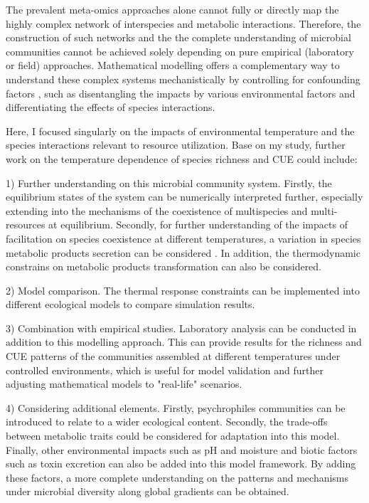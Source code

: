 \documentclass[11pt, a4paper]{article}
\begin{document}
\begin{spacing}{1.5}
The prevalent meta-omics approaches alone cannot fully or directly map the highly complex network of interspecies and metabolic interactions. Therefore, the construction of such networks and the the complete understanding of microbial communities cannot be achieved solely depending on pure empirical (laboratory or field) approaches. Mathematical modelling offers a complementary way to understand these complex systems mechanistically by controlling for confounding factors \citep{hanemaaijer2015systems, marsland2020minimal}, such as disentangling the impacts by various environmental factors and differentiating the effects of species interactions. 

Here, I focused singularly on the impacts of environmental temperature and the species interactions relevant to resource utilization. Base on my study, further work on the temperature dependence of species richness and CUE could include: 

1) Further understanding on this microbial community system. Firstly, the equilibrium states of the system can be numerically interpreted further, especially extending into the mechanisms of the coexistence of multispecies and multi-resources at equilibrium. Secondly, for further understanding of the impacts of facilitation on species coexistence at different temperatures, a variation in species metabolic products secretion can be considered \citep{grosskopf2016microbial}. In addition, the thermodynamic constrains on metabolic products transformation can also be considered. 

2) Model comparison. The thermal response constraints can be implemented into different ecological models to compare simulation results. 

3) Combination with empirical studies. Laboratory analysis can be conducted in addition to this modelling approach. This can provide results for the richness and CUE patterns of the communities assembled at different temperatures under controlled environments, which is useful for model validation and further adjusting mathematical models to "real-life" scenarios. 

4) Considering additional elements. Firstly, psychrophiles communities can be introduced to relate to a wider ecological content. Secondly, the trade-offs between metabolic traits could be considered for adaptation into this model. Finally, other environmental impacts such as pH and moisture \citep{manzoni2012environmental, fierer2009global} and biotic factors such as toxin excretion \citep{stempler2017interspecies} can also be added into this model framework. By adding these factors, a more complete understanding on the patterns and mechanisms under microbial diversity along global gradients can be obtained.



\end{spacing}
\end{document}

